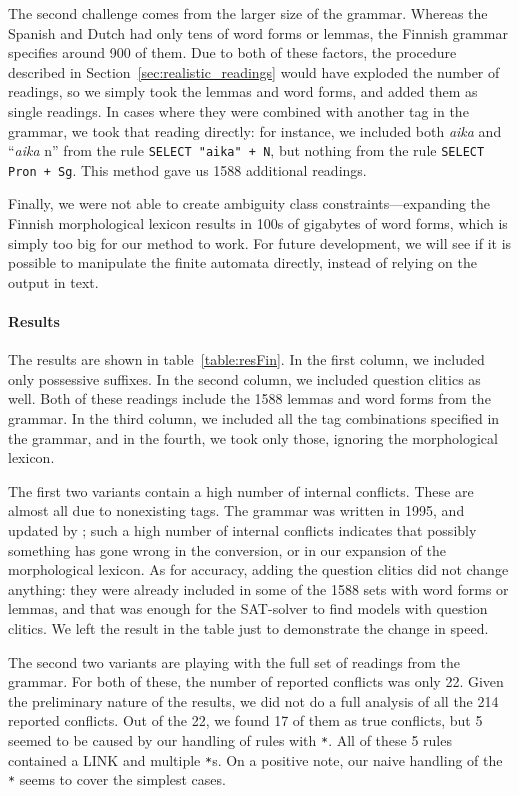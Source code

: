 The second challenge comes from the larger size of the grammar. Whereas the Spanish and Dutch had only tens of word forms or lemmas, the Finnish grammar specifies around 900 of them.
Due to both of these factors, the procedure described in Section~\ref{sec:realistic_readings} would have exploded the number of readings, so we simply took the lemmas and word forms, and added them as single readings. 
In cases where they were combined with another tag in the grammar, we took that reading directly: for instance, we included both \emph{aika} and ``\emph{aika} n'' from the rule \texttt{SELECT "aika" + N},
but nothing from the rule \texttt{SELECT Pron + Sg}. This method gave us 1588 additional readings.

Finally, we were not able to create ambiguity class constraints---expanding the Finnish morphological lexicon results in 100s of gigabytes of word forms, which is simply too big for our method to work. 
For future development, we will see if it is possible to manipulate the finite automata directly, instead of relying on the output in text.


\paragraph{Results}
The results are shown in table~\ref{table:resFin}.
In the first column, we included only possessive suffixes. In the second column, we included question clitics as well.
Both of these readings include the 1588 lemmas and word forms from the grammar.
In the third column, we included all the tag combinations specified in the grammar, and in the fourth, we took only those, ignoring the morphological lexicon.

The first two variants contain a high number of internal conflicts. 
These are almost all due to nonexisting tags. The grammar was written in 1995, and updated by ; such a high number of internal conflicts indicates that possibly something has gone wrong in the conversion, or in our expansion of the morphological lexicon.
As for accuracy, adding the question clitics did not change anything: they were already included in some of the 1588 sets with word forms or lemmas, and that was enough for the SAT-solver to find models with question clitics.
We left the result in the table just to demonstrate the change in speed.


The second two variants are playing with the full set of readings from the grammar. For both of these, the number of reported conflicts was only 22.
Given the preliminary nature of the results, we did not do a full analysis of all the 214 reported conflicts.
Out of the 22, we found 17 of them as true conflicts,
 but 5 seemed to be caused by our handling of rules with \verb!*!. 
All of these 5 rules contained a LINK and multiple \verb!*!s. On a positive note, our naive handling of the \verb!*! seems to cover the simplest cases.





